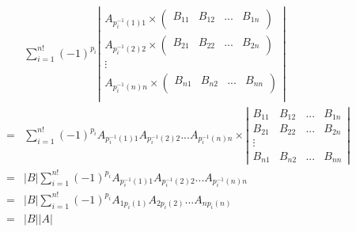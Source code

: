 \begin{align}
    &\sum_{i=1}^{n!} (-1)^{p_{i}}
    \left | \begin{matrix}
        A_{p_{i}^{-1}(1)1}\times\begin{pmatrix}
            B_{11} & B_{12} & ... & B_{1n}\\
        \end{pmatrix}\\
        A_{p_{i}^{-1}(2)2}\times\begin{pmatrix}
            B_{21} & B_{22} & ... & B_{2n}\\
        \end{pmatrix}\\
        \vdots\\
        A_{p_{i}^{-1}(n)n}\times\begin{pmatrix}
            B_{n1} & B_{n2} & ... & B_{nn}\\
        \end{pmatrix}\\
    \end{matrix} \right |\\
    =&\sum_{i=1}^{n!} (-1)^{p_{i}}
    A_{p_{i}^{-1}(1)1}A_{p_{i}^{-1}(2)2}...A_{p_{i}^{-1}(n)n}
    \times \left | \begin{matrix}
        B_{11} & B_{12} & ... & B_{1n}\\
        B_{21} & B_{22} & ... & B_{2n}\\
        \vdots\\
        B_{n1} & B_{n2} & ... & B_{nn}
    \end{matrix} \right |\\
    =&\left | B \right |
    \sum_{i=1}^{n!} (-1)^{p_{i}}
    A_{p_{i}^{-1}(1)1}A_{p_{i}^{-1}(2)2}...A_{p_{i}^{-1}(n)n}\\
    =&\left | B \right |
    \sum_{i=1}^{n!} (-1)^{p_{i}}
    A_{1p_{i}(1)}A_{2p_{i}(2)}...A_{np_{i}(n)}\\
    =&\left | B \right |
    \left | A \right |
\end{align}

